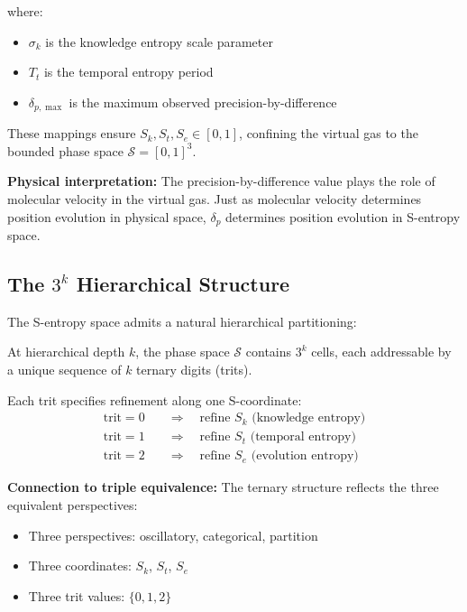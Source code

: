 where:
\begin{itemize}
\item $\sigma_k$ is the knowledge entropy scale parameter
\item $T_t$ is the temporal entropy period
\item $\delta_{p,\max}$ is the maximum observed precision-by-difference
\end{itemize}

These mappings ensure $S_k, S_t, S_e \in [0,1]$, confining the virtual gas to the bounded phase space $\mathcal{S} = [0,1]^3$.

\textbf{Physical interpretation:} The precision-by-difference value plays the role of molecular velocity in the virtual gas. Just as molecular velocity determines position evolution in physical space, $\delta_p$ determines position evolution in S-entropy space.

\subsection{The $3^k$ Hierarchical Structure}

The S-entropy space admits a natural hierarchical partitioning:

\begin{proposition}[$3^k$ Hierarchy]
\label{prop:3k_hierarchy}
At hierarchical depth $k$, the phase space $\mathcal{S}$ contains $3^k$ cells, each addressable by a unique sequence of $k$ ternary digits (trits).
\end{proposition}

Each trit specifies refinement along one S-coordinate:
\begin{align}
\text{trit} = 0 &\quad \Rightarrow \quad \text{refine } S_k \text{ (knowledge entropy)} \\
\text{trit} = 1 &\quad \Rightarrow \quad \text{refine } S_t \text{ (temporal entropy)} \\
\text{trit} = 2 &\quad \Rightarrow \quad \text{refine } S_e \text{ (evolution entropy)}
\end{align}

\textbf{Connection to triple equivalence:} The ternary structure reflects the three equivalent perspectives:
\begin{itemize}
\item Three perspectives: oscillatory, categorical, partition
\item Three coordinates: $S_k$, $S_t$, $S_e$
\item Three trit values: $\{0, 1, 2\}$
\end{itemize}

